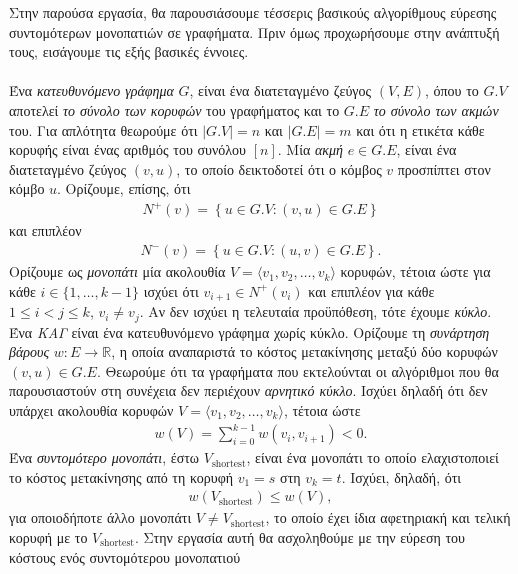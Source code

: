 \documentclass{article}
\newcommand{\sectiontitle}[1]{%
  \vspace{1.5em}%
  \noindent{\Large\bfseries\emph{#1}}\par%
  \vspace{0.5em}%
}
\begin{document}
\sectiontitle{Εισαγωγή - Βασικές έννοιες}
\noindent
Στην παρούσα εργασία, θα παρουσιάσουμε τέσσερις βασικούς αλγορίθμους εύρεσης συντομότερων
μονοπατιών σε γραφήματα. Πριν όμως προχωρήσουμε στην ανάπτυξή τους, εισάγουμε τις εξής βασικές έννοιες.
\\ \\
Ένα \emph{κατευθυνόμενο γράφημα} $G$, είναι ένα διατεταγμένο ζεύγος $(V, E)$, όπου το $G.V$ αποτελεί \emph{το σύνολο των κορυφών} του γραφήματος και το $G.E$ \emph{το σύνολο
των ακμών} του. Για απλότητα θεωρούμε ότι $|G.V| = n$ και $|G.E| = m$ και ότι η ετικέτα κάθε κορυφής είναι ένας αριθμός του συνόλου $[n]$. 
Μία \emph{ακμή} $e \in G.E$, είναι ένα διατεταγμένο ζεύγος $(v, u)$, το οποίο δεικτοδοτεί ότι ο κόμβος $v$ προσπίπτει στον κόμβο $u$. 
Ορίζουμε, επίσης, ότι
\begin{align*}
    N^+(v) = \left\{u \in G.V : (v, u) \in G.E \right\}
\end{align*}
και επιπλέον
\begin{align*}
    N^-(v) = \left\{u \in G.V : (u, v) \in G.E \right\}.
\end{align*}
Ορίζουμε ως \emph{μονοπάτι} μία ακολουθία $V = \langle v_1, v_2, \dots, v_k \rangle$ κορυφών, τέτοια ώστε για κάθε $i \in \{1, \dots, k - 1\}$ ισχύει ότι $v_{i + 1} \in N^{+}(v_i)$ και επιπλέον για κάθε $1 \leq i < j \leq k$, $v_i \neq v_j$. Αν δεν ισχύει η τελευταία προϋπόθεση,
τότε έχουμε \emph{κύκλο}. Ένα \emph{ΚΑΓ} είναι ένα κατευθυνόμενο γράφημα χωρίς κύκλο. Ορίζουμε τη \emph{συνάρτηση βάρους} $w : E \to \mathbb{R}$, η οποία αναπαριστά το κόστος μετακίνησης μεταξύ δύο κορυφών $(v, u) \in G.E$. Θεωρούμε ότι τα γραφήματα που εκτελούνται οι αλγόριθμοι που θα
παρουσιαστούν στη συνέχεια δεν περιέχουν \emph{αρνητικό κύκλο}. Ισχύει δηλαδή ότι δεν υπάρχει ακολουθία κορυφών $V = \langle v_1, v_2, \dots, v_k \rangle$, τέτοια ώστε
\begin{align*}
    w(V) = \sum_{i = 0}^{k - 1} w(v_i, v_{i + 1}) < 0.
\end{align*}
\noindent
Ένα \emph{συντομότερο μονοπάτι}, έστω $V_{\text{shortest}}$, είναι ένα μονοπάτι το οποίο ελαχιστοποιεί το κόστος μετακίνησης από τη κορυφή $v_1 = s$ στη $v_k = t$. Ισχύει, δηλαδή, ότι 
\begin{align*}
    w\left(V_{\text{shortest}}\right) \leq w(V),
\end{align*}
για οποιοδήποτε άλλο μονοπάτι $V \neq V_{\text{shortest}}$, το οποίο έχει ίδια αφετηριακή και τελική κορυφή με το $V_{\text{shortest}}$. Στην εργασία αυτή θα ασχοληθούμε με την εύρεση του κόστους ενός συντομότερου μονοπατιού
\end{document}

